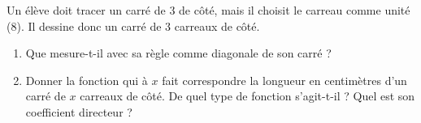 
\begin{exercice}\label{exosmath-0506}

    Un élève doit tracer un carré de \unit{3}{\centi\meter} de côté, mais il choisit le carreau comme unité (\unit{8}{\mili\meter}). Il dessine donc un carré de \( 3\) carreaux de côté.
    \begin{enumerate}
        \item
            Que mesure-t-il avec sa règle comme diagonale de son carré ?
        \item
            Donner la fonction qui à \( x\) fait correspondre la longueur en centimètres d'un carré de \( x\) carreaux de côté. De quel type de fonction s'agit-t-il ? Quel est son coefficient directeur ?
    \end{enumerate}

\end{exercice}
